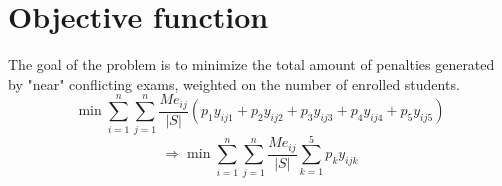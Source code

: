 \section*{Objective function}
The goal of the problem is to minimize the total amount of penalties generated by "near" conflicting exams, weighted on the number of enrolled students.
\[
\min{\sum_{i=1}^n \sum_{j=1}^n {\frac{Me_{ij}}{|S|} (p_{1} y_{ij1} + p_{2} y_{ij2} + p_{3} y_{ij3} + p_{4} y_{ij4} + p_{5} y_{ij5})}}
\]
\[
\Rightarrow \min{\sum_{i=1}^n \sum_{j=1}^n {\frac{Me_{ij}}{|S|}  \sum_ {k=1}^5 {p_{k} y_{ijk}}}}
\]